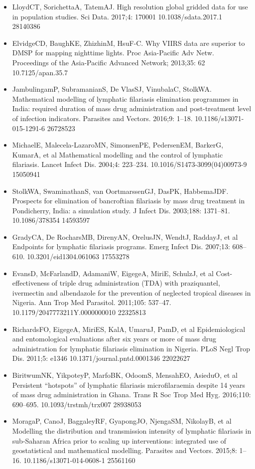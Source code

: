\documentclass[11pt,a4paper]{article}
\begin{document}
\begin{itemize}
\item LloydCT, SorichettaA, TatemAJ. High resolution global gridded data for use in population studies. Sci Data. 2017;4: 170001 10.1038/sdata.2017.1 28140386
\item ElvidgeCD, BaughKE, ZhizhinM, HsuF-C. Why VIIRS data are superior to DMSP for mapping nighttime lights. Proc Asia-Pacific Adv Netw. Proceedings of the Asia-Pacific Advanced Network; 2013;35: 62 10.7125/apan.35.7
\item JambulingamP, SubramanianS, De VlasSJ, VinubalaC, StolkWA. Mathematical modelling of lymphatic filariasis elimination programmes in India: required duration of mass drug administration and post-treatment level of infection indicators. Parasites and Vectors. 2016;9: 1–18. 10.1186/s13071-015-1291-6 26728523
\item MichaelE, Malecela-LazaroMN, SimonsenPE, PedersenEM, BarkerG, KumarA, et al Mathematical modelling and the control of lymphatic filariasis. Lancet Infect Dis. 2004;4: 223–234. 10.1016/S1473-3099(04)00973-9 15050941
\item StolkWA, SwaminathanS, van OortmarssenGJ, DasPK, HabbemaJDF. Prospects for elimination of bancroftian filariasis by mass drug treatment in Pondicherry, India: a simulation study. J Infect Dis. 2003;188: 1371–81. 10.1086/378354 14593597
\item GradyCA, De RocharsMB, DirenyAN, OrelusJN, WendtJ, RaddayJ, et al Endpoints for lymphatic filariasis programs. Emerg Infect Dis. 2007;13: 608–610. 10.3201/eid1304.061063 17553278
\item EvansD, McFarlandD, AdamaniW, EigegeA, MiriE, SchulzJ, et al Cost-effectiveness of triple drug administration (TDA) with praziquantel, ivermectin and albendazole for the prevention of neglected tropical diseases in Nigeria. Ann Trop Med Parasitol. 2011;105: 537–47. 10.1179/2047773211Y.0000000010 22325813
\item RichardsFO, EigegeA, MiriES, KalA, UmaruJ, PamD, et al Epidemiological and entomological evaluations after six years or more of mass drug administration for lymphatic filariasis elimination in Nigeria. PLoS Negl Trop Dis. 2011;5: e1346 10.1371/journal.pntd.0001346 22022627
\item BiritwumNK, YikpoteyP, MarfoBK, OdoomS, MensahEO, AsieduO, et al Persistent “hotspots” of lymphatic filariasis microfilaraemia despite 14 years of mass drug administration in Ghana. Trans R Soc Trop Med Hyg. 2016;110: 690–695. 10.1093/trstmh/trx007 28938053
\item MoragaP, CanoJ, BaggaleyRF, GyapongJO, NjengaSM, NikolayB, et al Modelling the distribution and transmission intensity of lymphatic filariasis in sub-Saharan Africa prior to scaling up interventions: integrated use of geostatistical and mathematical modelling. Parasites and Vectors. 2015;8: 1–16. 10.1186/s13071-014-0608-1 25561160

\end{itemize}
\end{document}
